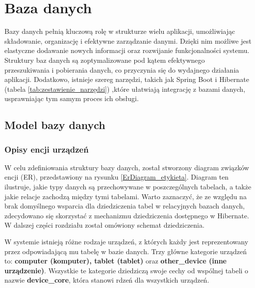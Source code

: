 \chapter{Baza danych}



Bazy danych pełnią kluczową rolę w strukturze wielu aplikacji, umożliwiając składowanie, organizację i efektywne zarządzanie danymi. Dzięki nim możliwe jest elastyczne dodawanie nowych informacji oraz rozwijanie funkcjonalności systemu. Struktury baz danych są zoptymalizowane pod kątem efektywnego przeszukiwania i pobierania danych, co przyczynia się do wydajnego działania aplikacji. Dodatkowo, istnieje szereg narzędzi, takich jak Spring Boot i Hibernate (tabela \ref{tab:zestawienie_narzędzi})
,które ułatwiają integrację z bazami danych, usprawniając tym samym proces ich obsługi.

\section{Model bazy danych}

\subsection{Opisy encji urządzeń}
W celu zdefiniowania struktury bazy danych, został stworzony diagram związków encji (ER), przedstawiony na rysunku \ref{ErDiagram_etykieta}. Diagram ten ilustruje, jakie typy danych są przechowywane w poszczególnych tabelach, a także jakie relacje zachodzą między tymi tabelami. Warto zaznaczyć, że ze względu na brak domyślnego wsparcia dla dziedziczenia tabel w relacyjnych bazach danych, zdecydowano się skorzystać z mechanizmu dziedziczenia dostępnego w Hibernate. W dalszej części rozdziału został omówiony schemat dziedziczenia.

W systemie istnieją różne rodzaje urządzeń, z których każdy jest reprezentowany przez odpowiadającą mu tabelę w bazie danych. Trzy główne kategorie urządzeń to: \textbf{computer (komputer), tablet (tablet)} oraz \textbf{other\_device (inne urządzenie)}. Wszystkie te kategorie dziedziczą swoje cechy od wspólnej tabeli o nazwie \textbf{device\_core}, która stanowi rdzeń dla wszystkich urządzeń.

